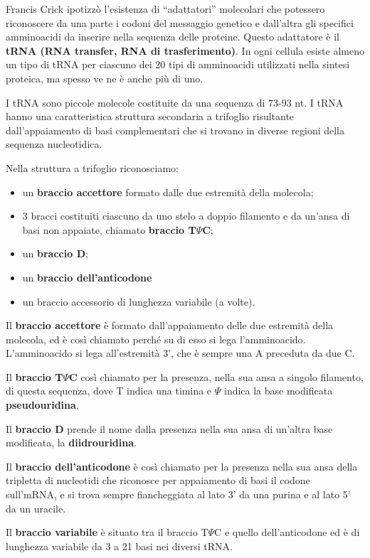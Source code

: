 \documentclass[11pt]{book}
\begin{document}
Francis Crick ipotizzò l'esistenza di ``adattatori'' molecolari che
potessero riconoscere da una parte i codoni del messaggio genetico e
dall'altra gli specifici amminoacidi da inserire nella sequenza delle
proteine. Questo adattatore è il \textbf{tRNA (RNA transfer, RNA di
trasferimento)}. In ogni cellula esiste almeno un tipo di tRNA per
ciascuno dei 20 tipi di amminoacidi utilizzati nella sintesi proteica,
ma spesso ve ne è anche più di uno.

I tRNA sono piccole molecole costituite da una sequenza di 73-93 nt. I
tRNA hanno una caratteristica struttura secondaria a trifoglio
risultante dall'appaiamento di basi complementari che si trovano in
diverse regioni della sequenza nucleotidica.

Nella struttura a trifoglio riconosciamo:

\begin{itemize}
\itemsep1pt\parskip0pt
\item
  un \textbf{braccio accettore} formato dalle due estremità della
  molecola;
\item
  3 bracci costituiti ciascuno da uno stelo a doppio filamento e da
  un'ansa di basi non appaiate, chiamato \textbf{braccio T\(\Psi\)C};
\item
  un \textbf{braccio D};
\item
  un \textbf{braccio dell'anticodone}
\item
  un braccio accessorio di lunghezza variabile (a volte).
\end{itemize}

Il \textbf{braccio accettore} è formato dall'appaiamento delle due
estremità della molecola, ed è così chiamato perché su di esso si lega
l'amminoacido. L'amminoacido si lega all'estremità 3', che è sempre una
A preceduta da due C.

Il \textbf{braccio T\(\Psi\)C} così chiamato per la presenza, nella sua
ansa a singolo filamento, di questa sequenza, dove T indica una timina e
\(\Psi\) indica la base modificata \textbf{pseudouridina}.

Il \textbf{braccio D} prende il nome dalla presenza nella sua ansa di
un'altra base modificata, la \textbf{diidrouridina}.

Il \textbf{braccio dell'anticodone} è così chiamato per la presenza
nella sua ansa della tripletta di nucleotidi che riconosce per
appaiamento di basi il codone sull'mRNA, e si trova sempre fiancheggiata
al lato 3' da una purina e al lato 5' da un uracile.

Il \textbf{braccio variabile} è situato tra il braccio T\(\Psi\)C e
quello dell'anticodone ed è di lunghezza variabile da 3 a 21 basi nei
diversi tRNA.
\end{document}
